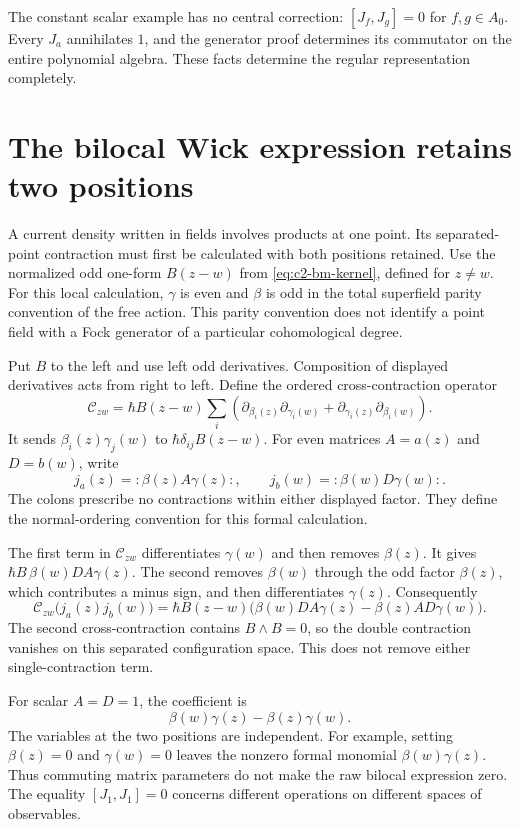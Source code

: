 The constant scalar example has no central correction:
$[J_f,J_g]=0$ for $f,g\in A_0$.
Every $J_a$ annihilates $1$, and the generator proof determines its
commutator on the entire polynomial algebra.
These facts determine the regular representation completely.

\section{The bilocal Wick expression retains two positions}
\label{sec:clo-bilocal-wick}

A current density written in fields involves products at one point.
Its separated-point contraction must first be calculated with both
positions retained.
Use the normalized odd one-form $B(z-w)$ from
\eqref{eq:c2-bm-kernel}, defined for $z\ne w$.
For this local calculation, $\gamma$ is even and $\beta$ is odd in
the total superfield parity convention of the free action.
This parity convention does not identify a point field with a Fock
generator of a particular cohomological degree.

Put $B$ to the left and use left odd derivatives.
Composition of displayed derivatives acts from right to left.
Define the ordered cross-contraction operator
\[
 \mathcal C_{zw}=\hbar B(z-w)\sum_i
 \left(
 \partial_{\beta_i(z)}\partial_{\gamma_i(w)}
 +\partial_{\gamma_i(z)}\partial_{\beta_i(w)}
 \right).
\]
It sends $\beta_i(z)\gamma_j(w)$ to
$\hbar\delta_{ij}B(z-w)$.
For even matrices $A=a(z)$ and $D=b(w)$, write
\[
 j_a(z)=:\beta(z)A\gamma(z):,\qquad
 j_b(w)=:\beta(w)D\gamma(w):.
\]
The colons prescribe no contractions within either displayed factor.
They define the normal-ordering convention for this formal calculation.

The first term in $\mathcal C_{zw}$ differentiates $\gamma(w)$ and
then removes $\beta(z)$. It gives
$\hbar B\,\beta(w)DA\gamma(z)$.
The second removes $\beta(w)$ through the odd factor $\beta(z)$,
which contributes a minus sign, and then differentiates $\gamma(z)$.
Consequently
\begin{equation}\label{eq:clo-raw-wick}
 \mathcal C_{zw}\bigl(j_a(z)j_b(w)\bigr)
 =\hbar B(z-w)
 \bigl(\beta(w)DA\gamma(z)-\beta(z)AD\gamma(w)\bigr).
\end{equation}
The second cross-contraction contains $B\wedge B=0$, so the double
contraction vanishes on this separated configuration space.
This does not remove either single-contraction term.

For scalar $A=D=1$, the coefficient is
\[
 \beta(w)\gamma(z)-\beta(z)\gamma(w).
\]
The variables at the two positions are independent.
For example, setting $\beta(z)=0$ and $\gamma(w)=0$ leaves the
nonzero formal monomial $\beta(w)\gamma(z)$.
Thus commuting matrix parameters do not make the raw bilocal expression
zero. The equality $[J_1,J_1]=0$ concerns different operations on
different spaces of observables.

